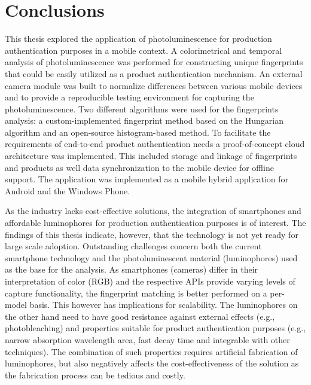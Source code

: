\documentclass[thesis.tex]{subfiles}
\begin{document}
\chapter{Conclusions}
\label{chapter:conclusions}

This thesis explored the application of photoluminescence for production authentication purposes in a mobile context. A colorimetrical and temporal analysis of photoluminescence was performed for constructing unique fingerprints that could be easily utilized as a product authentication mechanism. An external camera module was built to normalize differences between various mobile devices and to provide a reproducible testing environment for capturing the photoluminescence. Two different algorithms were used for the fingerprints analysis: a custom-implemented fingerprint method based on the Hungarian algorithm and an open-source histogram-based method. To facilitate the requirements of end-to-end product authentication needs a proof-of-concept cloud architecture was implemented. This included storage and linkage of fingerprints and products as well data synchronization to the mobile device for offline support. The application was implemented as a mobile hybrid application for Android and the Windows Phone.

As the industry lacks cost-effective solutions, the integration of smartphones and affordable luminophores for production authentication purposes is of interest. The findings of this thesis indicate, however, that the technology is not yet ready for large scale adoption. Outstanding challenges concern both the current smartphone technology and the photoluminescent material (luminophores) used as the base for the analysis. As smartphones (cameras) differ in their interpretation of color (RGB) and the respective APIs provide varying levels of capture functionality, the fingerprint matching is better performed on a per-model basis. This however has implications for scalability. The luminophores on the other hand need to have good resistance against external effects (e.g., photobleaching) and properties suitable for product authentication purposes (e.g., narrow absorption wavelength area, fast decay time and integrable with other techniques). The combination of such properties requires artificial fabrication of luminophores, but also negatively affects the cost-effectiveness of the solution as the fabrication process can be tedious and costly.
\end{document}
